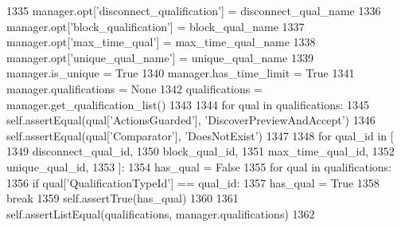 \begin{DoxyCode}
1335         manager.opt[\textcolor{stringliteral}{'disconnect\_qualification'}] = disconnect\_qual\_name
1336         manager.opt[\textcolor{stringliteral}{'block\_qualification'}] = block\_qual\_name
1337         manager.opt[\textcolor{stringliteral}{'max\_time\_qual'}] = max\_time\_qual\_name
1338         manager.opt[\textcolor{stringliteral}{'unique\_qual\_name'}] = unique\_qual\_name
1339         manager.is\_unique = \textcolor{keyword}{True}
1340         manager.has\_time\_limit = \textcolor{keyword}{True}
1341         manager.qualifications = \textcolor{keywordtype}{None}
1342         qualifications = manager.get\_qualification\_list()
1343 
1344         \textcolor{keywordflow}{for} qual \textcolor{keywordflow}{in} qualifications:
1345             self.assertEqual(qual[\textcolor{stringliteral}{'ActionsGuarded'}], \textcolor{stringliteral}{'DiscoverPreviewAndAccept'})
1346             self.assertEqual(qual[\textcolor{stringliteral}{'Comparator'}], \textcolor{stringliteral}{'DoesNotExist'})
1347 
1348         \textcolor{keywordflow}{for} qual\_id \textcolor{keywordflow}{in} [
1349             disconnect\_qual\_id,
1350             block\_qual\_id,
1351             max\_time\_qual\_id,
1352             unique\_qual\_id,
1353         ]:
1354             has\_qual = \textcolor{keyword}{False}
1355             \textcolor{keywordflow}{for} qual \textcolor{keywordflow}{in} qualifications:
1356                 \textcolor{keywordflow}{if} qual[\textcolor{stringliteral}{'QualificationTypeId'}] == qual\_id:
1357                     has\_qual = \textcolor{keyword}{True}
1358                     \textcolor{keywordflow}{break}
1359             self.assertTrue(has\_qual)
1360 
1361         self.assertListEqual(qualifications, manager.qualifications)
1362 
\end{DoxyCode}
\mbox{\label{classparlai_1_1mturk_1_1core_1_1dev_1_1test_1_1test__mturk__manager_1_1TestMTurkManagerConnectedFunctions_a780c4799ea08d54aa3505d2a6ca391a4}} 
